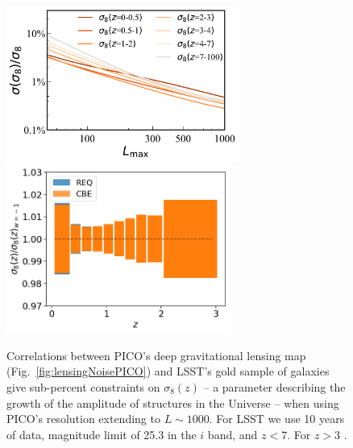 \documentclass[PICOReport.tex]{subfiles}
\begin{document}
\begin{figure}
\centering
\hspace{-0.15in}
\includegraphics[width=3in]{images/PICO_s8_lmax_PICOv4.1b_deproj0_SENS0_LSST10yrGold.pdf}
\hspace{-0.15in}
\includegraphics[width=2.9in,trim= 0cm 0.2cm 0cm 0cm]{images/PICOS8.png}
\caption{\captiontext  
Correlations between PICO's deep gravitational lensing map (Fig.~\ref{fig:lensingNoisePICO}) and LSST's gold sample of galaxies give sub-percent constraints on $\sigma_{8}(z)$ -- a parameter describing the growth of the amplitude of structures in the Universe -- when using PICO's resolution extending to $L\sim1000$. For LSST we use 10 years of data, magnitude limit of 25.3 in the $i$ band, and $z<7$. For $z>3$ .}
\label{fig:clbb}
\end{figure}

\end{document}
